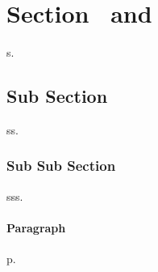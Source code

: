 \documentclass[final]{ltugboat}
\begin{document}
\section{Section \TUB\ and } s.
\subsection{Sub Section \TUB} ss.
\subsubsection{Sub Sub Section \TUB} sss.
\paragraph{Paragraph} p.
\end{document}
